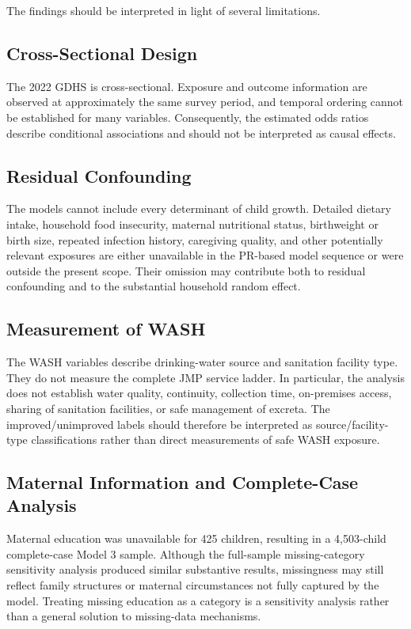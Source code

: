 The findings should be interpreted in light of several limitations.

\subsection{Cross-Sectional Design}

The 2022 GDHS is cross-sectional. Exposure and outcome information are observed at approximately the same survey period, and temporal ordering cannot be established for many variables. Consequently, the estimated odds ratios describe conditional associations and should not be interpreted as causal effects.

\subsection{Residual Confounding}

The models cannot include every determinant of child growth. Detailed dietary intake, household food insecurity, maternal nutritional status, birthweight or birth size, repeated infection history, caregiving quality, and other potentially relevant exposures are either unavailable in the PR-based model sequence or were outside the present scope. Their omission may contribute both to residual confounding and to the substantial household random effect.

\subsection{Measurement of WASH}

The WASH variables describe drinking-water source and sanitation facility type. They do not measure the complete JMP service ladder. In particular, the analysis does not establish water quality, continuity, collection time, on-premises access, sharing of sanitation facilities, or safe management of excreta. The improved/unimproved labels should therefore be interpreted as source/facility-type classifications rather than direct measurements of safe WASH exposure.

\subsection{Maternal Information and Complete-Case Analysis}

Maternal education was unavailable for 425 children, resulting in a 4,503-child complete-case Model 3 sample. Although the full-sample missing-category sensitivity analysis produced similar substantive results, missingness may still reflect family structures or maternal circumstances not fully captured by the model. Treating missing education as a category is a sensitivity analysis rather than a general solution to missing-data mechanisms.

